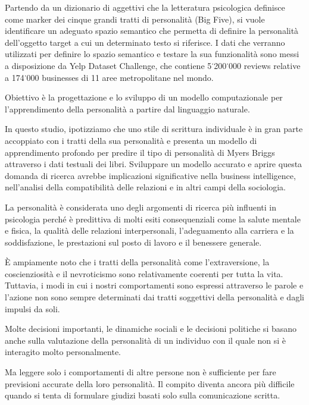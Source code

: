 Partendo da un dizionario di aggettivi che la letteratura psicologica definisce come marker dei cinque grandi tratti di personalità (Big Five), si vuole identificare un adeguato spazio semantico che permetta di definire la personalità dell’oggetto target a cui un determinato testo si riferisce. I dati che verranno utilizzati per definire lo spazio semantico e testare la sua funzionalità sono messi a disposizione da Yelp Dataset Challenge, che contiene 5˙200˙000 reviews relative a 174˙000 businesses di 11 aree metropolitane nel mondo. 




Obiettivo è la progettazione e lo sviluppo di un modello computazionale per l'apprendimento della personalità a partire dal linguaggio naturale.  


In questo studio, ipotizziamo che uno stile di scrittura individuale è in gran parte accoppiato con i tratti della sua personalità e presenta un modello di apprendimento profondo per predire il tipo di personalità di Myers Briggs attraverso i dati testuali dei libri. Sviluppare un modello accurato e aprire questa domanda di ricerca avrebbe implicazioni significative nella business intelligence, nell'analisi della compatibilità delle relazioni e in altri campi della sociologia.



La personalità è considerata uno degli argomenti di ricerca più influenti in psicologia perché è predittiva di molti esiti consequenziali come la salute mentale e fisica, la qualità delle relazioni interpersonali, l'adeguamento alla carriera e la soddisfazione, le prestazioni sul posto di lavoro e il benessere generale.

È ampiamente noto che i tratti della personalità come l'extraversione, la coscienziosità e il nevroticismo sono relativamente coerenti per tutta la vita. Tuttavia, i modi in cui i nostri comportamenti sono espressi attraverso le parole e l'azione non sono sempre determinati dai tratti soggettivi della personalità e dagli impulsi da soli.

Molte decisioni importanti, le dinamiche sociali e le decisioni politiche si basano anche sulla valutazione della personalità di un individuo con il quale non si è interagito molto personalmente. 

Ma leggere solo i comportamenti di altre persone non è sufficiente per fare previsioni accurate della loro personalità. Il compito diventa ancora più difficile quando si tenta di formulare giudizi basati solo sulla comunicazione scritta. 

